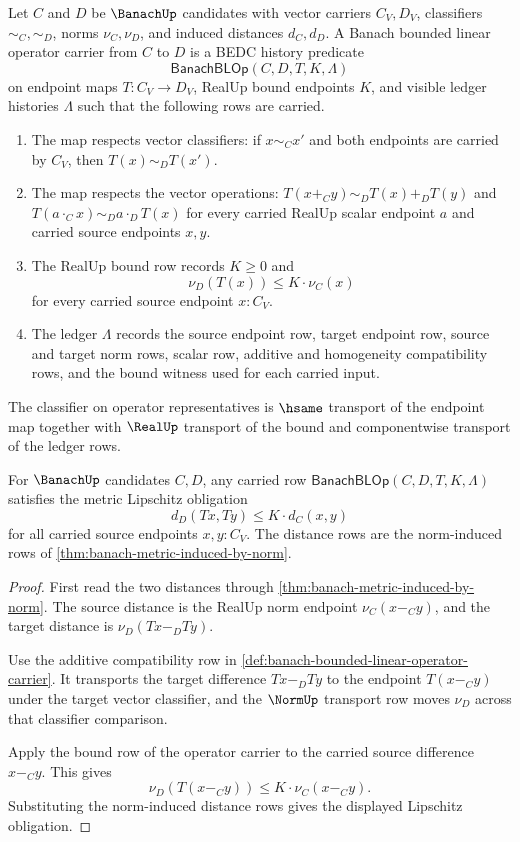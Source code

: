 \begin{definition}
\label{def:banach-bounded-linear-operator-carrier}
Let $C$ and $D$ be $\BanachUp$ candidates with vector carriers $C_V,D_V$,
classifiers $\sim_C,\sim_D$, norms $\nu_C,\nu_D$, and induced distances
$d_C,d_D$. A Banach bounded linear operator carrier from $C$ to $D$ is a BEDC
history predicate
$$
\mathsf{BanachBLOp}(C,D,T,K,\Lambda)
$$
on endpoint maps $T:C_V\to D_V$, RealUp bound endpoints $K$, and visible
ledger histories $\Lambda$ such that the following rows are carried.
\begin{enumerate}
\item The map respects vector classifiers: if $x\sim_C x'$ and both
endpoints are carried by $C_V$, then $T(x)\sim_D T(x')$.
\item The map respects the vector operations:
$T(x+_C y)\sim_D T(x)+_D T(y)$ and
$T(a\cdot_C x)\sim_D a\cdot_D T(x)$ for every carried RealUp scalar endpoint
$a$ and carried source endpoints $x,y$.
\item The RealUp bound row records $K\ge 0$ and
$$
\nu_D(T(x))\le K\cdot\nu_C(x)
$$
for every carried source endpoint $x:C_V$.
\item The ledger $\Lambda$ records the source endpoint row, target endpoint
row, source and target norm rows, scalar row, additive and homogeneity
compatibility rows, and the bound witness used for each carried input.
\end{enumerate}
The classifier on operator representatives is $\hsame$ transport of the
endpoint map together with $\RealUp$ transport of the bound and componentwise
transport of the ledger rows.
\end{definition}

\begin{theorem}
\label{thm:banach-bounded-linear-operator-lipschitz}
For $\BanachUp$ candidates $C,D$, any carried row
$\mathsf{BanachBLOp}(C,D,T,K,\Lambda)$ satisfies the metric Lipschitz
obligation
$$
d_D(Tx,Ty)\le K\cdot d_C(x,y)
$$
for all carried source endpoints $x,y:C_V$. The distance rows are the
norm-induced rows of \autoref{thm:banach-metric-induced-by-norm}.
\end{theorem}
\begin{proof}
First read the two distances through
\autoref{thm:banach-metric-induced-by-norm}. The source distance is the
RealUp norm endpoint $\nu_C(x-_C y)$, and the target distance is
$\nu_D(Tx-_D Ty)$.

Use the additive compatibility row in
\autoref{def:banach-bounded-linear-operator-carrier}. It transports the target
difference $Tx-_D Ty$ to the endpoint $T(x-_C y)$ under the target vector
classifier, and the $\NormUp$ transport row moves $\nu_D$ across that
classifier comparison.

Apply the bound row of the operator carrier to the carried source difference
$x-_C y$. This gives
$$
\nu_D(T(x-_C y))\le K\cdot\nu_C(x-_C y).
$$
Substituting the norm-induced distance rows gives the displayed Lipschitz
obligation.
\end{proof}

